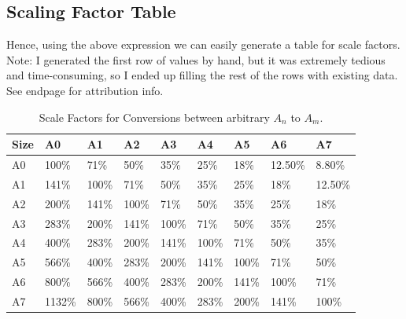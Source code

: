 \subsection*{Scaling Factor Table}
Hence, using the above expression we can easily generate a table for scale factors. Note: I generated the first row of values by hand, but it was extremely tedious and time-consuming, so I ended up filling the rest of the rows with existing data. See endpage for attribution info.

\begin{table}[h]
\centering\makegapedcells
\begin{tabular}{@{}lllllllll@{}}
\toprule
Size & A0     & A1    & A2    & A3    & A4    & A5    & A6      & A7      \\ \midrule
A0   & 100\%  & 71\%  & 50\%  & 35\%  & 25\%  & 18\%  & 12.50\% & 8.80\%  \\
A1   & 141\%  & 100\% & 71\%  & 50\%  & 35\%  & 25\%  & 18\%    & 12.50\% \\
A2   & 200\%  & 141\% & 100\% & 71\%  & 50\%  & 35\%  & 25\%    & 18\%    \\
A3   & 283\%  & 200\% & 141\% & 100\% & 71\%  & 50\%  & 35\%    & 25\%    \\
A4   & 400\%  & 283\% & 200\% & 141\% & 100\% & 71\%  & 50\%    & 35\%    \\
A5   & 566\%  & 400\% & 283\% & 200\% & 141\% & 100\% & 71\%    & 50\%    \\
A6   & 800\%  & 566\% & 400\% & 283\% & 200\% & 141\% & 100\%   & 71\%    \\
A7   & 1132\% & 800\% & 566\% & 400\% & 283\% & 200\% & 141\%   & 100\%   \\ \bottomrule
\end{tabular}
\caption{Scale Factors for Conversions between arbitrary $A_n$ to $A_m$. }
\label{tab:scale-factor}
\end{table}
